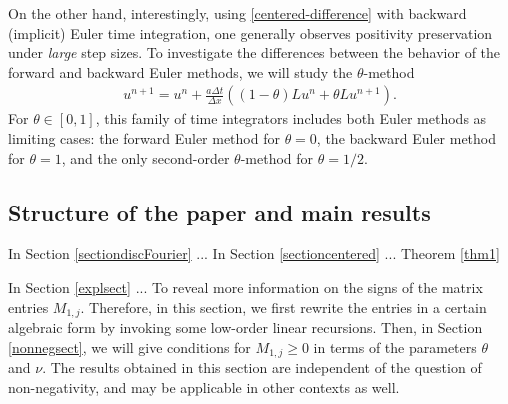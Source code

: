 \documentclass[a4paper]{article}
\newcommand{\dt}{\Delta t}
\newcommand{\dx}{\Delta x}
\newcommand{\te}{\theta}
\begin{document}
On the other hand, interestingly, using \eqref{centered-difference} with backward (implicit) 
Euler time integration, one generally observes positivity preservation
under \emph{large} step sizes.  To investigate the differences between the behavior
of the forward and backward Euler methods, we will study the $\theta$-method \cite[Chapter IV.3]{hairerwanner}
\begin{align}\label{firsttheta}
    u^{n+1} = u^n + \frac{a\dt}{\dx}((1-\theta)Lu^n + \theta Lu^{n+1}).
\end{align}
For $\te\in[0,1]$, this family of time integrators includes both Euler methods as limiting cases: the forward Euler method for $\te=0$, the backward 
 Euler method for $\te=1$, and the only second-order $\te$-method for $\te=1/2$. 









\subsection{Structure of the paper and main results}
In Section \ref{sectiondiscFourier} ... In Section \ref{sectioncentered} ... Theorem \ref{thm1} 

In Section \ref{explsect} ...  To reveal more information on the signs of the matrix entries $M_{1,j}$. Therefore, in this section, we first rewrite the  entries in a certain algebraic form by invoking some low-order linear recursions. Then, in Section \ref{nonnegsect}, we will give conditions for $M_{1,j}\ge 0$ in terms of the parameters $\te$ and $\nu$.
The results obtained in this section are independent of the question of non-negativity, and may be applicable in other contexts as well.\\
\end{document}
